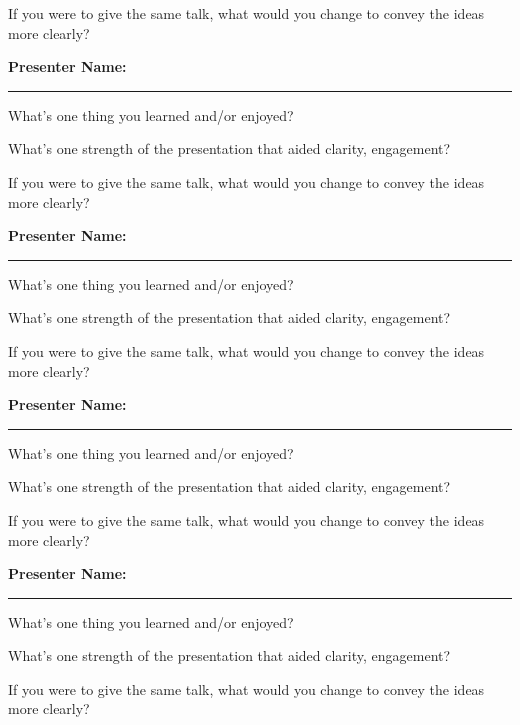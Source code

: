 \documentclass[11pt]{article}
\begin{document}
\vspace{0.5in}

\noindent
If you were to give the same talk, what would you change to convey the ideas more clearly?

\vspace{0.75in}
\noindent
\textbf{Presenter Name:} \rule{10cm}{1pt}

\bigskip
\noindent
What's one thing you learned and/or enjoyed?

\vspace{0.5in}

\noindent
What's one strength of the presentation that aided clarity, engagement?

\vspace{0.5in}

\noindent
If you were to give the same talk, what would you change to convey the ideas more clearly?

\vspace{0.75in}

\noindent
\textbf{Presenter Name:} \rule{10cm}{1pt}

\bigskip
\noindent
What's one thing you learned and/or enjoyed?

\vspace{0.5in}

\noindent
What's one strength of the presentation that aided clarity, engagement?

\vspace{0.5in}

\noindent
If you were to give the same talk, what would you change to convey the ideas more clearly?

\vspace{0.5in}

\pagebreak
\noindent
\textbf{Presenter Name:} \rule{10cm}{1pt}

\bigskip
\noindent
What's one thing you learned and/or enjoyed?

\vspace{0.5in}

\noindent
What's one strength of the presentation that aided clarity, engagement?

\vspace{0.5in}

\noindent
If you were to give the same talk, what would you change to convey the ideas more clearly?

\vspace{0.75in}

\noindent
\textbf{Presenter Name:} \rule{10cm}{1pt}

\bigskip
\noindent
What's one thing you learned and/or enjoyed?

\vspace{0.5in}

\noindent
What's one strength of the presentation that aided clarity, engagement?

\vspace{0.5in}

\noindent
If you were to give the same talk, what would you change to convey the ideas more clearly?

\vspace{0.5in}
\end{document}
